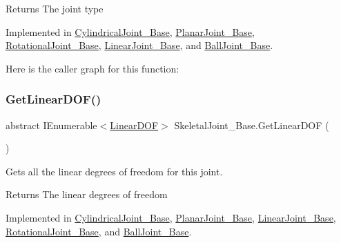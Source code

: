 \begin{DoxyReturn}{Returns}
The joint type
\end{DoxyReturn}


Implemented in \hyperlink{class_cylindrical_joint___base_a1ee432bc31e0ee98266169233210e621}{Cylindrical\+Joint\+\_\+\+Base}, \hyperlink{class_planar_joint___base_ab4646593b8f3d4b0ef7ddd86e783405e}{Planar\+Joint\+\_\+\+Base}, \hyperlink{class_rotational_joint___base_a58b8ae858b3f342302b5a28412ecac6b}{Rotational\+Joint\+\_\+\+Base}, \hyperlink{class_linear_joint___base_aa162de1777f1daaa7ca2234fc6a913ab}{Linear\+Joint\+\_\+\+Base}, and \hyperlink{class_ball_joint___base_a8bbdf57f42fe5bf6045c7accfb72993c}{Ball\+Joint\+\_\+\+Base}.

Here is the caller graph for this function\+:
\mbox{\label{class_skeletal_joint___base_a14564d8c44dfeef8b7a10044f2392cde}} 
\subsubsection{\texorpdfstring{Get\+Linear\+D\+O\+F()}{GetLinearDOF()}}
{\footnotesize\ttfamily abstract I\+Enumerable$<$\hyperlink{interface_linear_d_o_f}{Linear\+D\+OF}$>$ Skeletal\+Joint\+\_\+\+Base.\+Get\+Linear\+D\+OF (\begin{DoxyParamCaption}{ }\end{DoxyParamCaption})\hspace{0.3cm}{\ttfamily [pure virtual]}}



Gets all the linear degrees of freedom for this joint. 

\begin{DoxyReturn}{Returns}
The linear degrees of freedom
\end{DoxyReturn}


Implemented in \hyperlink{class_cylindrical_joint___base_a5e10f664ba08afb2788e2251831c8246}{Cylindrical\+Joint\+\_\+\+Base}, \hyperlink{class_planar_joint___base_a50dcc45fbe13093f40b7eeef117e8f16}{Planar\+Joint\+\_\+\+Base}, \hyperlink{class_linear_joint___base_ad506a9bf378650ab1d6cdedab91ed2a5}{Linear\+Joint\+\_\+\+Base}, \hyperlink{class_rotational_joint___base_a887b07a072831dd6af60ded53e3a461e}{Rotational\+Joint\+\_\+\+Base}, and \hyperlink{class_ball_joint___base_ae3bcfcc633282ab053048b39ba1c8b8d}{Ball\+Joint\+\_\+\+Base}.

